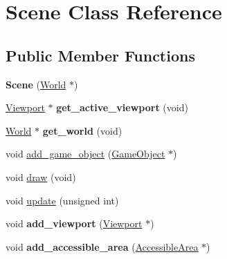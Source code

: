 \hypertarget{classScene}{
\section{Scene Class Reference}
\label{classScene}
}
\subsection*{Public Member Functions}
\begin{DoxyCompactItemize}
\item 
\hypertarget{classScene_a4eb3fdb166e0021e4e52fe19f9562183}{
{\bfseries Scene} (\hyperlink{classWorld}{World} $\ast$)}
\label{classScene_a4eb3fdb166e0021e4e52fe19f9562183}

\item 
\hypertarget{classScene_ac880d620e9331ee220eab871769bc26c}{
\hyperlink{classViewport}{Viewport} $\ast$ {\bfseries get\_\-active\_\-viewport} (void)}
\label{classScene_ac880d620e9331ee220eab871769bc26c}

\item 
\hypertarget{classScene_aca4855a051e9198608d26b6d9ae30cdb}{
\hyperlink{classWorld}{World} $\ast$ {\bfseries get\_\-world} (void)}
\label{classScene_aca4855a051e9198608d26b6d9ae30cdb}

\item 
void \hyperlink{classScene_af4940a9c9e62cb5ced3e7f5206d903a3}{add\_\-game\_\-object} (\hyperlink{classGameObject}{GameObject} $\ast$)
\item 
void \hyperlink{classScene_a41fbbe388ea322df338648e66611ffcf}{draw} (void)
\item 
void \hyperlink{classScene_a065d1b88078a09f2b77e80f663a40b2d}{update} (unsigned int)
\item 
\hypertarget{classScene_a8e146347a0f1dbe2231788a8d07d2746}{
void {\bfseries add\_\-viewport} (\hyperlink{classViewport}{Viewport} $\ast$)}
\label{classScene_a8e146347a0f1dbe2231788a8d07d2746}

\item 
\hypertarget{classScene_a25a901ef9a95f907b95a0cc955de34d1}{
void {\bfseries add\_\-accessible\_\-area} (\hyperlink{classAccessibleArea}{AccessibleArea} $\ast$)}
\label{classScene_a25a901ef9a95f907b95a0cc955de34d1}

\end{DoxyCompactItemize}


